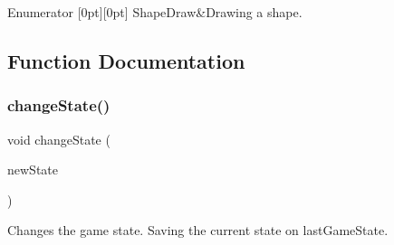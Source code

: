 \begin{DoxyEnumFields}{Enumerator}
[0pt][0pt]{}\mbox{\label{group__game__state_gga8cdac3f25ed2be17d210ff50defe0791abd8b963d05025a2c600b8a86b63d480d}} 
Shape\+Draw&Drawing a shape. \\
\hline

\end{DoxyEnumFields}


\subsection{Function Documentation}
\mbox{\label{group__game__state_ga903c5ec1f682a02fdf7213d99031ff8b}} 
\subsubsection{\texorpdfstring{change\+State()}{changeState()}}
{\footnotesize\ttfamily void change\+State (\begin{DoxyParamCaption}\item[{\mbox{\hyperlink{group__game__state_ga7899b65f1ea0f655e4bbf8d2a5714285}{Game\+State}}}]{new\+State }\end{DoxyParamCaption})}



Changes the game state. Saving the current state on last\+Game\+State. 



